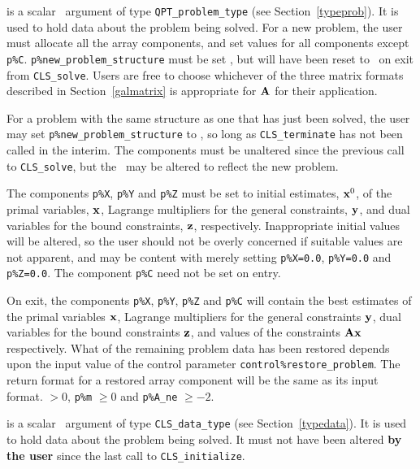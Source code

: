 \documentclass{galahad}
\newcommand{\packagename}{CLS}
\begin{document}
\vspace*{-3mm}
\begin{description}
 is a scalar \intentinout\ argument of type
{\tt QPT\_problem\_type}
(see Section~\ref{typeprob}).
It is used to hold data about the problem being solved.
For a new problem, the user must allocate all the array components,
and set values for all components except {\tt p\%C}.
{\tt p\%new\_problem\_structure} must be set \true, but will have been reset
to \false\ on exit from {\tt \packagename\_solve}.
Users are free to choose whichever
of the three matrix formats described in Section~\ref{galmatrix}
is appropriate for ${\mathbf{A}}$ for their application.

For a problem with the same structure as one that has just been
solved, the user may set {\tt p\%new\_problem\_str\-u\-cture} to \false,
so long as {\tt \packagename\_terminate} has not been called in the interim.
The \integer components must be unaltered since the
previous call to {\tt \packagename\_solve}, but the \realdp\
may be altered to reflect the new problem.

The components {\tt p\%X}, {\tt p\%Y} and {\tt p\%Z}
must be set to initial estimates, ${\mathbf{x}}^{0}$, of the primal variables,
${\mathbf{x}}$, Lagrange multipliers for the general constraints, ${\mathbf{y}}$,
and dual variables for the bound constraints, ${\mathbf{z}}$, respectively.
Inappropriate initial values will be altered, so the user should
not be overly concerned if suitable values are not apparent, and may be
content with merely setting {\tt p\%X=0.0},
{\tt p\%Y=0.0} and {\tt p\%Z=0.0}.
The component {\tt p\%C} need not be set on entry.

On exit, the components {\tt p\%X}, {\tt p\%Y}, {\tt p\%Z} and {\tt p\%C}
will contain the best estimates of the primal variables ${\mathbf{x}}$,
Lagrange multipliers for the general
constraints ${\mathbf{y}}$, dual variables for the bound constraints ${\mathbf{z}}$,
and values of the constraints ${\mathbf{A}} {\mathbf{x}}$ respectively.
What of the remaining problem data has been restored depends upon
the input value of the control parameter {\tt control\%restore\_problem}.
The return format for a restored array component will be the same as its
input format.
 $> 0$, {\tt p\%m} $\geq 0$ and {\tt p\%A\_ne}
              $\geq -2$.

 is a scalar \intentinout\ argument of type
{\tt \packagename\_data\_type}
(see Section~\ref{typedata}). It is used to hold data about the problem being
solved. It must not have been altered {\bf by the user} since the last call to
{\tt \packagename\_initialize}.


\end{description}
\end{document}
